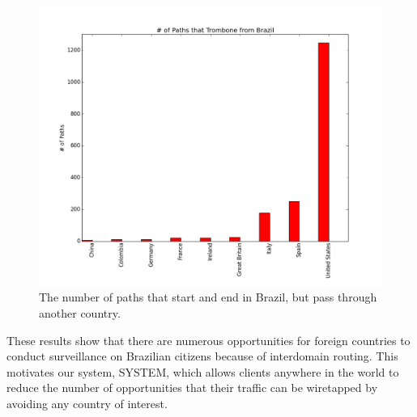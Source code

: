 \begin{figure}
\centering
\includegraphics[width=.5\textwidth]{trombone_graph}
\caption{The number of paths that start and end in Brazil, but pass through another country.}
\label{fig:trombone}
\end{figure}

These results show that there are numerous opportunities for foreign countries to conduct surveillance on Brazilian citizens because of interdomain routing.  This motivates our system, SYSTEM, which allows clients anywhere in the world to reduce the number of opportunities that their traffic can be wiretapped by avoiding any country of interest.  
